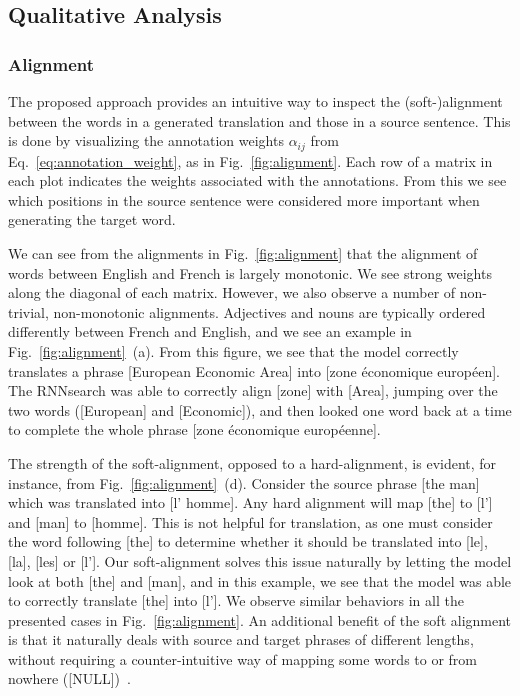 \subsection{Qualitative Analysis}

\subsubsection{Alignment}

The proposed approach provides an intuitive way to inspect the
\mbox{(soft-)alignment} between the words in a generated translation and those
in a source sentence.  This is done by visualizing the annotation weights
$\alpha_{ij}$ from Eq.~\eqref{eq:annotation_weight}, as in
Fig.~\ref{fig:alignment}. Each row of a matrix in each plot indicates the
weights associated with the annotations. From this we see which positions in the
source sentence were considered more important when generating the target word. 

We can see from the alignments in Fig.~\ref{fig:alignment} that the alignment of
words between English and French is largely monotonic. We see strong weights
along the diagonal of each matrix. However, we also observe a number of
non-trivial, non-monotonic alignments. Adjectives and nouns are typically
ordered differently between French and English, and we see an example in
Fig.~\ref{fig:alignment}~(a). From this figure, we see that the model correctly
translates a phrase [European Economic Area] into [zone \'economique
europ\'een]. The RNNsearch was able to correctly align [zone] with [Area],
jumping over the two words ([European] and [Economic]), and then looked one word
back at a time to complete the whole phrase [zone \'economique europ\'eenne]. 

The strength of the soft-alignment, opposed to a hard-alignment, is evident, for
instance, from Fig.~\ref{fig:alignment}~(d). Consider the source phrase [the
man] which was translated into [l' homme]. Any hard alignment will map [the] to
[l'] and [man] to [homme]. This is not helpful for translation, as one must
consider the word following [the] to determine whether it should be translated
into [le], [la], [les] or [l'].  Our soft-alignment solves this issue naturally
by letting the model look at both [the] and [man], and in this example, we see
that the model was able to correctly translate [the] into [l']. We observe
similar behaviors in all the presented cases in Fig.~\ref{fig:alignment}. An
additional benefit of the soft alignment is that it naturally deals with source
and target phrases of different lengths, without requiring a counter-intuitive
way of mapping some words to or from nowhere ([NULL])~\citep[see, e.g.,
Chapters~4 and 5 of][]{Koehn2010}.

